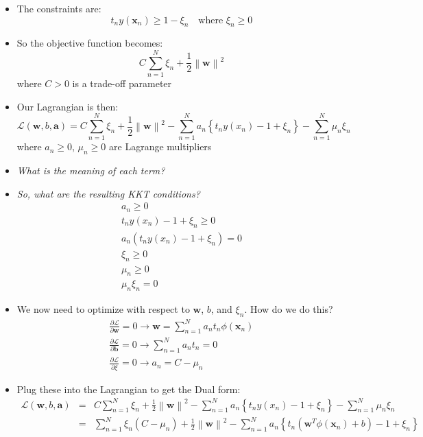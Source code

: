 \documentclass[11pt]{amsart}
\def\x{\mathbf{x}}
\def\w{\mathbf{w}}
\begin{document}
\begin{itemize}
\item The constraints are:
\begin{equation}
t_n y(\x_n) \ge 1 - \xi_n \quad \text{where } \xi_n \ge 0
\end{equation}
\item So the objective function becomes:
\begin{equation}
C\sum_{n=1}^N\xi_n + \frac{1}{2}\left\| \w \right\|^2
\end{equation}
where $C > 0$ is a trade-off parameter
\item Our Lagrangian is then:
\begin{equation}
\mathscr{L}(\w, b, \mathbf{a}) = C\sum_{n=1}^N\xi_n + \frac{1}{2}\left\| \w \right\|^2 - \sum_{n=1}^N a_n\left\{ t_ny(x_n) - 1 +\xi_n\right\} - \sum_{n=1}^N \mu_n\xi_n
\end{equation}
where $a_n \ge 0$, $\mu_n \ge 0$ are Lagrange multipliers
\item\emph{What is the meaning of each term?}
\item \emph{So, what are the resulting KKT conditions? }
\begin{eqnarray}
a_n \ge 0\\
 t_ny(x_n) - 1 +\xi_n \ge 0\\
 a_n(t_ny(x_n) - 1 +\xi_n) = 0\\
 \xi_n \ge 0\\
 \mu_n \ge 0 \\
 \mu_n\xi_n = 0
\end{eqnarray}
\item We now need to optimize with respect to $\w$, $b$, and $\xi_n$.  How do we do this? 
\begin{eqnarray}
\frac{\partial \mathscr{L}}{\partial \w} = 0 \rightarrow \w = \sum_{n=1}^N a_nt_n\phi(\x_n)\\
\frac{\partial \mathscr{L}}{\partial \mathbf{b}} = 0 \rightarrow \sum_{n=1}^Na_nt_n = 0 \\
\frac{\partial \mathscr{L}}{\partial \xi} = 0 \rightarrow a_n = C - \mu_n
\end{eqnarray}    
\item Plug these into the Lagrangian to get the Dual form:
\begin{eqnarray}
\mathscr{L}(\w, b, \mathbf{a}) &=& C\sum_{n=1}^N\xi_n + \frac{1}{2}\left\| \w \right\|^2 - \sum_{n=1}^N a_n\left\{ t_ny(x_n) - 1 +\xi_n\right\} - \sum_{n=1}^N \mu_n\xi_n\\
 &=& \sum_{n=1}^N\xi_n (C-\mu_n)+ \frac{1}{2}\left\| \w \right\|^2 - \sum_{n=1}^N a_n\left\{ t_n\left(\w^T\phi(\x_n) + b\right) - 1 +\xi_n\right\} \\

\end{eqnarray}
\end{itemize}
\end{document}
